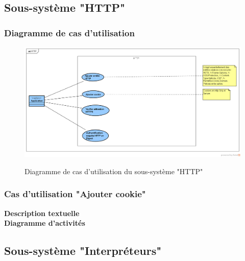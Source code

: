 \subsection{Sous-système "HTTP"}
\subsubsection{Diagramme de cas d'utilisation}
\begin{figure}[H]
	\centering
	\begin{minipage}{12cm}
		\centering
		{\includegraphics[height=0.35\textheight, width=1\textwidth]{fig/HTTP-use-case-diagram.png}}
	\end{minipage}
	\caption{Diagramme de cas d'utilisation du sous-système "HTTP"}
	\label{fig:7.17}
\end{figure}
\subsubsection{Cas d'utilisation "Ajouter cookie"}
\textbf{\RIGHTarrow Description textuelle}\\
\textbf{\RIGHTarrow Diagramme d'activités}\\

\subsection{Sous-système "Interpréteurs"}
